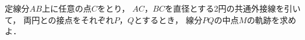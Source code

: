 \documentclass[../../main.tex]{subfiles}
\begin{document}
定線分$AB$上に任意の点$C$をとり，
$AC$，$BC$を直径とする2円の共通外接線を引いて，
両円との接点をそれぞれ$P$，$Q$とするとき，
線分$PQ$の中点$M$の軌跡を求めよ．
\end{document}
